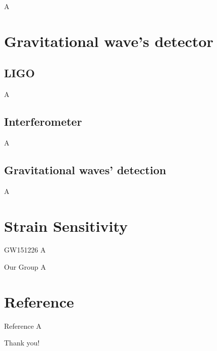 \documentclass[pdf]{beamer}
\begin{document}
\begin{frame}
A
\end{frame}

\section{Gravitational wave's detector}
\subsection{LIGO}
\begin{frame}
A
\end{frame}

\subsection{Interferometer}
\begin{frame}
A
\end{frame}

\subsection{Gravitational waves' detection}
\begin{frame}
A
\end{frame}


\section{Strain Sensitivity}
\begin{frame}{GW151226}
A
\end{frame}


\begin{frame}{Our Group}
A
\end{frame}

\section*{Reference}
\begin{frame}{Reference}
A
\end{frame}

\begin{frame}
\begin{center}
\Huge Thank you!
\end{center}
\end{frame}
\end{document}
